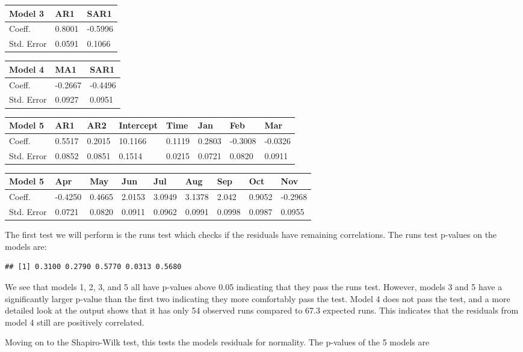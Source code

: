 \documentclass[
]{article}
\begin{document}
\begin{longtable}[]{@{}lll@{}}
\toprule
Model 3 & AR1 & SAR1\tabularnewline
\midrule
\endhead
Coeff. & 0.8001 & -0.5996\tabularnewline
Std. Error & 0.0591 & 0.1066\tabularnewline
\bottomrule
\end{longtable}

\begin{longtable}[]{@{}lll@{}}
\toprule
Model 4 & MA1 & SAR1\tabularnewline
\midrule
\endhead
Coeff. & -0.2667 & -0.4496\tabularnewline
Std. Error & 0.0927 & 0.0951\tabularnewline
\bottomrule
\end{longtable}

\begin{longtable}[]{@{}llllllll@{}}
\toprule
Model 5 & AR1 & AR2 & Intercept & Time & Jan & Feb & Mar\tabularnewline
\midrule
\endhead
Coeff. & 0.5517 & 0.2015 & 10.1166 & 0.1119 & 0.2803 & -0.3008 &
-0.0326\tabularnewline
Std. Error & 0.0852 & 0.0851 & 0.1514 & 0.0215 & 0.0721 & 0.0820 &
0.0911\tabularnewline
\bottomrule
\end{longtable}

\begin{longtable}[]{@{}lllllllll@{}}
\toprule
Model 5 & Apr & May & Jun & Jul & Aug & Sep & Oct & Nov\tabularnewline
\midrule
\endhead
Coeff. & -0.4250 & 0.4665 & 2.0153 & 3.0949 & 3.1378 & 2.042 & 0.9052 &
-0.2968\tabularnewline
Std. Error & 0.0721 & 0.0820 & 0.0911 & 0.0962 & 0.0991 & 0.0998 &
0.0987 & 0.0955\tabularnewline
\bottomrule
\end{longtable}

The first test we will perform is the runs test which checks if the
residuals have remaining correlations. The runs test p-values on the
models are:

\begin{verbatim}
## [1] 0.3100 0.2790 0.5770 0.0313 0.5680
\end{verbatim}

We see that models 1, 2, 3, and 5 all have p-values above 0.05
indicating that they pass the runs test. However, models 3 and 5 have a
significantly larger p-value than the first two indicating they more
comfortably pass the test. Model 4 does not pass the test, and a more
detailed look at the output shows that it has only 54 observed runs
compared to 67.3 expected runs. This indicates that the residuals from
model 4 still are positively correlated.

Moving on to the Shapiro-Wilk test, this tests the models residuals for
normality. The p-values of the 5 models are
\end{document}

